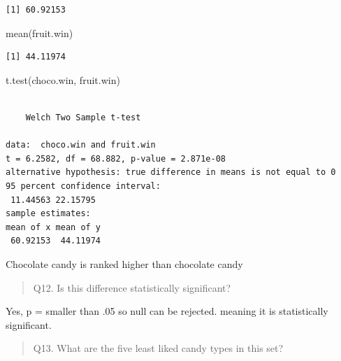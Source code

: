 \documentclass[
  letterpaper,
  DIV=11,
  numbers=noendperiod]{scrartcl}
\newenvironment{Shaded}{\begin{snugshade}}{\end{snugshade}}
\newcommand{\DecValTok}[1]{\textcolor[rgb]{0.68,0.00,0.00}{#1}}
\newcommand{\FunctionTok}[1]{\textcolor[rgb]{0.28,0.35,0.67}{#1}}
\newcommand{\NormalTok}[1]{\textcolor[rgb]{0.00,0.23,0.31}{#1}}
\newcommand{\OtherTok}[1]{\textcolor[rgb]{0.00,0.23,0.31}{#1}}
\newcommand{\SpecialCharTok}[1]{\textcolor[rgb]{0.37,0.37,0.37}{#1}}
\begin{document}
\begin{verbatim}
[1] 60.92153
\end{verbatim}

\begin{Shaded}
\begin{Highlighting}[]
\FunctionTok{mean}\NormalTok{(fruit.win)}
\end{Highlighting}
\end{Shaded}

\begin{verbatim}
[1] 44.11974
\end{verbatim}

\begin{Shaded}
\begin{Highlighting}[]
\FunctionTok{t.test}\NormalTok{(choco.win, fruit.win)}
\end{Highlighting}
\end{Shaded}

\begin{verbatim}

    Welch Two Sample t-test

data:  choco.win and fruit.win
t = 6.2582, df = 68.882, p-value = 2.871e-08
alternative hypothesis: true difference in means is not equal to 0
95 percent confidence interval:
 11.44563 22.15795
sample estimates:
mean of x mean of y 
 60.92153  44.11974 
\end{verbatim}

Chocolate candy is ranked higher than chocolate candy

\begin{quote}
Q12. Is this difference statistically significant?
\end{quote}

Yes, p = smaller than .05 so null can be rejected. meaning it is
statistically significant.

\begin{quote}
Q13. What are the five least liked candy types in this set?
\end{quote}

\begin{Shaded}
\end{Shaded}
\end{document}
